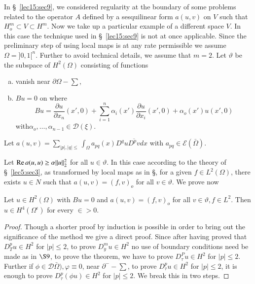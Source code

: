 In \S\ \ref{lec15:sec9}, we considered regularity at the boundary of some
problems related to the operator $A$ defined by a sesquilinear form $a
(u, v)$ on $V$ such that $H^m_o \subset V \subset H^m$. Now we take up
a particular example of a different space $V$. In this case the
technique used in \S\ \ref{lec15:sec9} is not at once applicable. Since the
preliminary step of using local maps is at any rate permissible we
assume $\Omega = ] 0, 1 [^n$. Further to avoid technical details, we
  assume that $m = 2$. Let $\vartheta$ be the subspace of $H^2
  (\Omega)$ consisting of functions 
\begin{enumerate}[a)]
\item vanish near $\partial \Omega - \sum$, 
\item $Bu = 0$ on where
  $$
  Bu = \frac{\partial u}{\partial x_n} (x' , 0) + \sum_{i = 1}^{n}
  \alpha_i (x') \frac{\partial u}{\partial x_i} (x' , 0) + \alpha_o (x')
  u (x', 0) 
  $$
  with\pageoriginale $\alpha_o, \ldots , \alpha_{n-1} \in \mathscr{D} ( \xi )$. 
\end{enumerate}

Let $a(u, v) = \sum\limits_{|p|, |q| \leq} \int_\Omega a_{pq} (x) D^q
u \overline{D^p v} dx$ with $a_{pq} \in \mathscr{E}
(\bar{\Omega})$.  

Let $\operatorname{Re} a(u, u) \geq \alpha || u ||^2_2$ for all $u \in
\vartheta$. In this case according to the theory of \S\ \ref{lec5:sec3}, as
transformed by local maps as in \S, for a given $f \in L^2
(\Omega)$, there exists $u \in N$ such that $a (u, v) = (f,
v)_o $ for all $v \in \vartheta$. We prove now 
\begin{theorem}\label{lec21:sec11:subsec2:thm11.2} %
  Let $u \in H^2 (\Omega)$ with $Bu = 0$ and $a(u, v) = (f,
  v)_o$ for all $v \in \vartheta, f \in L^2$. Then $u
  \in H^4 (\Omega^{\epsilon})$ for every $\in > 0$.  
\end{theorem}

\begin{proof} %
Though a shorter proof by induction is possible in order to bring out
the significance of the method we give a direct proof. Since after
having proved that $D^p_T u \in H^2$ for $| p | \leq 2$, to
prove $D^m _y u \in H^2$ no use of boundary conditions need be
made as in $\S 9$, to prove the theorem, we have to prove $D^P_\tau u
\in H^2$ for $| p | \leq 2$. Further if $\phi \in
\mathscr{D} \bar{\Omega}), \varphi \equiv 0$, near $\partial^- -
\sum$, to prove $D^p_\tau u \in H^2 $ for $|p | \leq 2$, it is
enough to prove $D^p_\tau (\phi u ) \in H^2 $ for $| p | \leq
2$. We break this in two steps.  
\end{proof}

